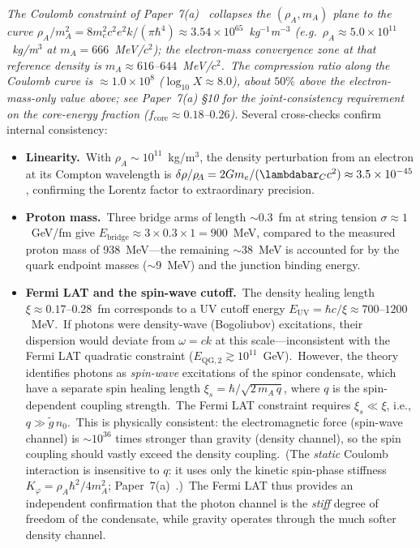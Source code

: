 ﻿\documentclass[12pt,letterpaper]{article}
\newcommand{\rhoa}{\rho_{\!A}}
\begin{document}
\noindent\textit{The Coulomb constraint of Paper~7(a)~\cite{otto-boundcore}
collapses the $(\rhoa, m_A)$ plane to the curve
$\rhoa/m_A^2 = 8 m_e^2 c^2 e^2 k/(\pi\hbar^4) \approx
3.54\times10^{65}$~kg$^{-1}$m$^{-3}$ (e.g.\
$\rhoa \approx 5.0\times10^{11}$~kg/m$^3$ at $m_A = 666$~MeV/$c^2$); the
electron-mass convergence zone at that reference density is
$m_A \approx 616$--$644$~MeV/$c^2$.\ The compression ratio along the
Coulomb curve is $\approx 1.0\times10^{8}$ ($\log_{10}X \approx 8.0$),
about $50\%$ above the electron-mass-only value above; see Paper~7(a) §10
for the joint-consistency requirement on the core-energy fraction
($f_{\mathrm{core}} \approx 0.18$--$0.26$).}
%
Several cross-checks confirm internal consistency:
%
\begin{itemize}[leftmargin=2em]
  \item \textbf{Linearity.}\ With $\rhoa \sim 10^{11}$~kg/m$^3$, the density
    perturbation from an electron at its Compton wavelength is
    $\delta\rho/\rhoa = 2Gm_e/(\lambdabar_C c^2) \approx 3.5 \times 10^{-45}$,
    confirming the Lorentz factor to extraordinary precision.

  \item \textbf{Proton mass.}\ Three bridge arms of length $\sim$0.3~fm at
    string tension $\sigma \approx 1$~GeV/fm give
    $E_{\mathrm{bridge}} \approx 3 \times 0.3 \times 1 = 900$~MeV, compared
    to the measured proton mass of 938~MeV---the remaining $\sim$38~MeV is
    accounted for by the quark endpoint masses ($\sim$9~MeV) and the junction
    binding energy.

  \item \textbf{Fermi LAT and the spin-wave cutoff.}\ The density healing
    length $\xi \approx 0.17$--$0.28$~fm corresponds to a UV cutoff energy
    $E_{\mathrm{UV}} = \hbar c / \xi \approx 700$--$1200$~MeV.\ If photons
    were density-wave (Bogoliubov) excitations, their dispersion would
    deviate from $\omega = ck$ at this scale---inconsistent with the Fermi
    LAT quadratic constraint ($E_{\mathrm{QG},2} \gtrsim 10^{11}$~GeV).\
    However, the theory identifies photons as \emph{spin-wave} excitations
    of the spinor condensate, which have a separate spin healing length
    $\xi_s = \hbar / \sqrt{2\,m_A\,q}$, where $q$ is the spin-dependent
    coupling strength.\ The Fermi LAT constraint requires
    $\xi_s \ll \xi$, i.e., $q \gg \tilde{g}\,n_0$.\ This is physically
    consistent: the electromagnetic force (spin-wave channel) is
    $\sim\!10^{36}$ times stronger than gravity (density channel), so
    the spin coupling should vastly exceed the density coupling.\ (The
    \emph{static} Coulomb interaction is insensitive to $q$: it uses only
    the kinetic spin-phase stiffness
    $K_\varphi = \rhoa\hbar^2/4m_A^2$; Paper~7(a)~\cite{otto-boundcore}.)\ The
    Fermi LAT thus provides an independent confirmation that the photon
    channel is the \emph{stiff} degree of freedom of the condensate,
    while gravity operates through the much softer density channel.


\end{itemize}
\end{document}
